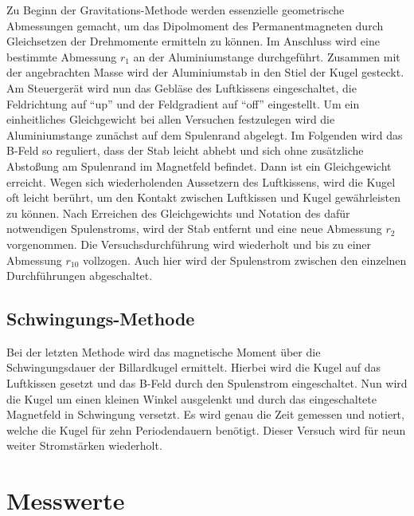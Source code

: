 \noindent Zu Beginn der Gravitations-Methode werden essenzielle geometrische Abmessungen gemacht, um das Dipolmoment des 
Permanentmagneten durch Gleichsetzen der Drehmomente ermitteln zu können. Im Anschluss wird eine bestimmte Abmessung $r_1$ 
an der Aluminiumstange durchgeführt. Zusammen mit der angebrachten Masse wird der Aluminiumstab in den Stiel der Kugel gesteckt. 
Am Steuergerät wird nun das Gebläse des Luftkissens eingeschaltet, die Feldrichtung auf \enquote{up} und der Feldgradient auf 
\enquote{off} eingestellt. Um ein einheitliches Gleichgewicht bei allen Versuchen festzulegen wird die Aluminiumstange zunächst auf 
dem Spulenrand abgelegt. Im Folgenden wird das B-Feld so reguliert, dass der Stab leicht abhebt und sich ohne zusätzliche 
Abstoßung am Spulenrand im Magnetfeld befindet. Dann ist ein Gleichgewicht erreicht. Wegen sich wiederholenden Aussetzern des 
Luftkissens, wird die Kugel oft leicht berührt, um den Kontakt zwischen Luftkissen und Kugel gewährleisten zu können.
Nach Erreichen des Gleichgewichts und Notation des dafür notwendigen Spulenstroms, wird der Stab entfernt und eine neue Abmessung 
$r_2$ vorgenommen. Die Versuchsdurchführung wird wiederholt und bis zu einer Abmessung $r_10$ vollzogen. Auch hier wird der 
Spulenstrom zwischen den einzelnen Durchführungen abgeschaltet.

\subsection{Schwingungs-Methode}

\noindent Bei der letzten Methode wird das magnetische Moment über die Schwingungsdauer der Billardkugel ermittelt. Hierbei wird
die Kugel auf das Luftkissen gesetzt und das B-Feld durch den Spulenstrom eingeschaltet. Nun wird die Kugel um einen kleinen Winkel 
ausgelenkt und durch das eingeschaltete Magnetfeld in Schwingung versetzt. Es wird genau die Zeit gemessen und notiert, welche 
die Kugel für zehn Periodendauern benötigt. Dieser Versuch wird für neun weiter Stromstärken wiederholt.

\section{Messwerte}




